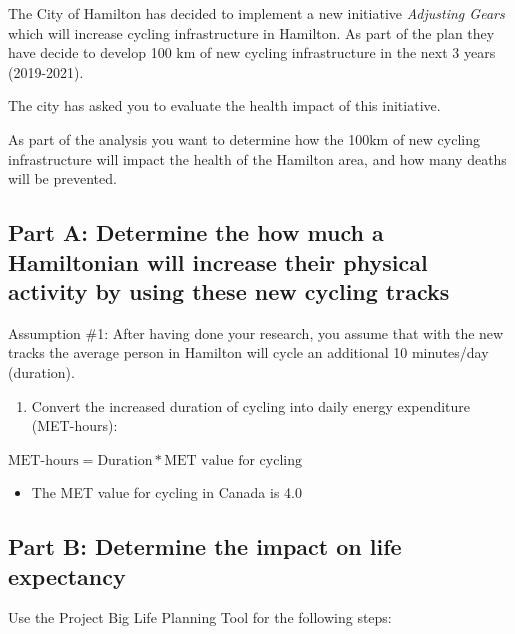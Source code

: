 \documentclass[]{book}
\providecommand{\tightlist}{%
  \setlength{\itemsep}{0pt}\setlength{\parskip}{0pt}}
\begin{document}
The City of Hamilton has decided to implement a new initiative \emph{Adjusting Gears} which will increase cycling infrastructure in Hamilton. As part of the plan they have decide to develop 100 km of new cycling infrastructure in the next 3 years (2019-2021).

The city has asked you to evaluate the health impact of this initiative.

As part of the analysis you want to determine how the 100km of new cycling infrastructure will impact the health of the Hamilton area, and how many deaths will be prevented.

\hypertarget{part-a-determine-the-how-much-a-hamiltonian-will-increase-their-physical-activity-by-using-these-new-cycling-tracks}{%
\subsection{Part A: Determine the how much a Hamiltonian will increase their physical activity by using these new cycling tracks}\label{part-a-determine-the-how-much-a-hamiltonian-will-increase-their-physical-activity-by-using-these-new-cycling-tracks}}

Assumption \#1: After having done your research, you assume that with the new tracks the average person in Hamilton will cycle an additional 10 minutes/day (duration).

\begin{enumerate}
\def\labelenumi{\arabic{enumi}.}
\tightlist
\item
  Convert the increased duration of cycling into daily energy expenditure (MET-hours):
\end{enumerate}

\(\text{MET-hours} = \text{Duration}*\text{MET value for cycling}\)

\begin{itemize}
\tightlist
\item
  The MET value for cycling in Canada is 4.0
\end{itemize}

\hypertarget{part-b-determine-the-impact-on-life-expectancy}{%
\subsection{Part B: Determine the impact on life expectancy}\label{part-b-determine-the-impact-on-life-expectancy}}

Use the Project Big Life Planning Tool for the following steps:
\end{document}
